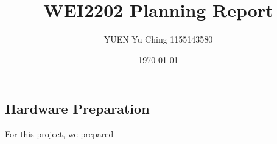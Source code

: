 \documentclass{article}
\title{WEI2202 Planning Report}
\author{YUEN Yu Ching 1155143580}
\date{\today}
\begin{document}
\maketitle
\begin{multicols}{2}
\section{Hardware Preparation}
For this project, we prepared
\end{multicols}



\end{document}
